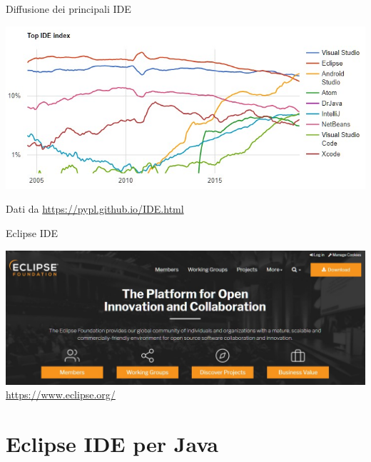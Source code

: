 \documentclass[presentation]{beamer}
\begin{document}
\begin{frame}{Diffusione dei principali IDE}
	\begin{center}
		\includegraphics[width=\textwidth]{img/ide2019.png}
	\end{center}
	\centering
	Dati da \url{https://pypl.github.io/IDE.html}
\end{frame}

\begin{frame}{Eclipse IDE}
\begin{center}
\includegraphics[width=\textwidth]{img/eclipse-web-site.png}
\url{https://www.eclipse.org/}
\end{center}
\end{frame}

\section{Eclipse IDE per Java}
\end{document}
